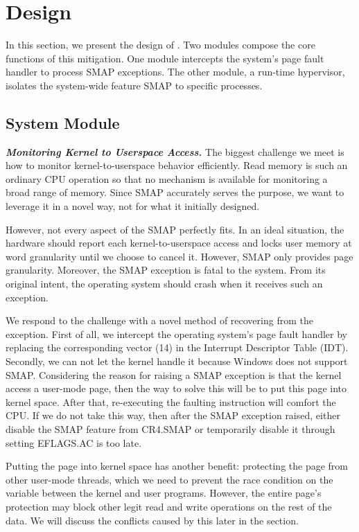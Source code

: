 
\section{\name Design}
\label{sec:ktoctou-design}

In this section, we present the design of \name. Two modules compose the core functions of this mitigation. One module intercepts the system's page fault handler to process SMAP exceptions. The other module, a run-time hypervisor, isolates the system-wide feature SMAP to specific processes.

\subsection{System Module}

\textbf{\textit{Monitoring Kernel to Userspace Access.}} The biggest challenge we meet is how to monitor kernel-to-userspace behavior efficiently. Read memory is such an ordinary CPU operation so that no mechanism is available for monitoring a broad range of memory. Since SMAP accurately serves the purpose, we want to leverage it in a novel way, not for what it initially designed.

However, not every aspect of the SMAP perfectly fits. In an ideal situation, the hardware should report each kernel-to-userspace access and locks user memory at word granularity until we choose to cancel it.  However, SMAP only provides page granularity. Moreover, the SMAP exception is fatal to the system. From its original intent, the operating system should crash when it receives such an exception.



We respond to the challenge with a novel method of recovering from the exception. First of all, we intercept the operating system's page fault handler by replacing the corresponding vector (14) in the Interrupt Descriptor Table (IDT). Secondly, we can not let the kernel handle it because Windows does not support SMAP. Considering the reason for raising a SMAP exception is that the kernel access a user-mode page, then the way to solve this will be to put this page into kernel space. After that, re-executing the faulting instruction will comfort the CPU. If we do not take this way, then after the SMAP exception raised, either disable the SMAP feature from CR4.SMAP or temporarily disable it through setting EFLAGS.AC is too late. 

Putting the page into kernel space has another benefit: protecting the page from other user-mode threads, which we need to prevent the race condition on the variable between the kernel and user programs. However, the entire page's protection may block other legit read and write operations on the rest of the data. We will discuss the conflicts caused by this later in the section.

